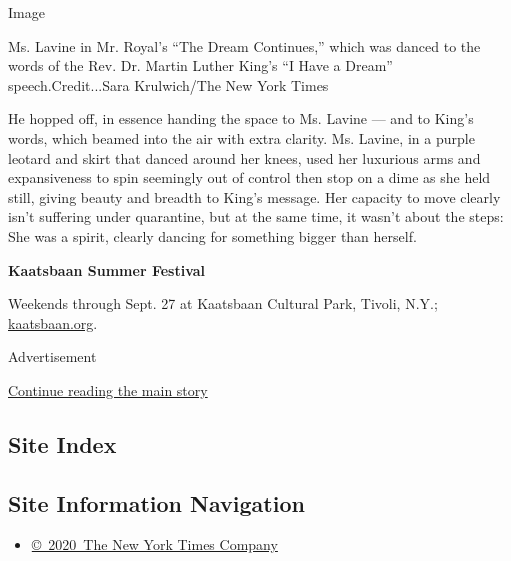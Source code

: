 Image

Ms. Lavine in Mr. Royal's ``The Dream Continues,'' which was danced to
the words of the Rev. Dr. Martin Luther King's ``I Have a Dream''
speech.Credit...Sara Krulwich/The New York Times

He hopped off, in essence handing the space to Ms. Lavine --- and to
King's words, which beamed into the air with extra clarity. Ms. Lavine,
in a purple leotard and skirt that danced around her knees, used her
luxurious arms and expansiveness to spin seemingly out of control then
stop on a dime as she held still, giving beauty and breadth to King's
message. Her capacity to move clearly isn't suffering under quarantine,
but at the same time, it wasn't about the steps: She was a spirit,
clearly dancing for something bigger than herself.

\textbf{Kaatsbaan Summer Festival}

Weekends through Sept. 27 at Kaatsbaan Cultural Park, Tivoli, N.Y.;
\href{https://kaatsbaan.org/spring-summer-events}{kaatsbaan.org}.

Advertisement

\protect\hyperlink{after-bottom}{Continue reading the main story}

\hypertarget{site-index}{%
\subsection{Site Index}\label{site-index}}

\hypertarget{site-information-navigation}{%
\subsection{Site Information
Navigation}\label{site-information-navigation}}

\begin{itemize}
\tightlist
\item
  \href{https://help.nytimes.com/hc/en-us/articles/115014792127-Copyright-notice}{©~2020~The
  New York Times Company}
\end{itemize}

